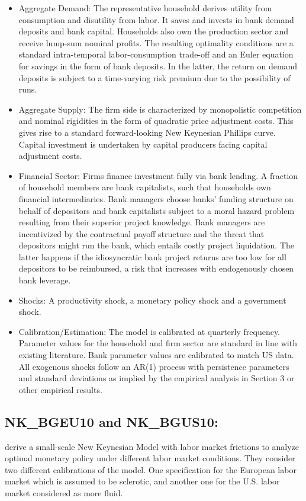 \documentclass[11pt,a4paper]{article}
\begin{document}
	\begin{itemize}
		\item Aggregate Demand: The representative household derives utility from consumption and disutility from labor. It saves and invests in bank demand deposits and bank capital. Households also own the production sector and receive lump-sum nominal profits. The resulting optimality conditions are a standard intra-temporal labor-consumption trade-off and an Euler equation for savings in the form of bank deposits. In the latter, the return on demand deposits is subject to a time-varying risk premium due to the possibility of runs. 
		\item Aggregate Supply: The firm side is characterized by monopolistic competition and nominal rigidities in the form of \cite{Rotemberg1982} quadratic price adjustment costs. This gives rise to a standard \cite{Rotemberg1982} forward-looking New Keynesian Phillips curve. Capital investment is undertaken by capital producers facing capital adjustment costs. 
		\item  Financial Sector: Firms finance investment fully via bank lending. A fraction of household members are bank capitalists, such that households own financial intermediaries. Bank managers choose banks' funding structure on behalf of depositors and bank capitalists subject to a moral hazard problem resulting from their superior project knowledge. Bank managers are incentivized by the contractual payoff structure and the threat that depositors might run the bank, which entails costly project liquidation. The latter happens if the idiosyncratic bank project returns are too low for all depositors to be reimbursed, a risk that increases with endogenously chosen bank leverage. 
		\item Shocks: A productivity shock, a monetary policy shock and a government shock. 
		\item Calibration/Estimation: The model is calibrated at quarterly frequency. Parameter values for the household and firm sector are standard in line with existing literature. Bank parameter values are calibrated to match US data. All exogenous shocks follow an AR(1) process with persistence parameters and standard deviations as implied by the empirical analysis in Section 3 or other empirical results.
	\end{itemize}
	
	
	\subsection{NK\_BGEU10 and NK\_BGUS10: \texorpdfstring{\cite{BlanchardGali10}}{Blanchard and GalÃƒÂ­ (2010)}}
	\label{NKBGEU10}
	\cite{BlanchardGali10} derive a small-scale New Keynesian Model with
	labor market frictions to analyze optimal monetary policy under different
	labor market conditions. They consider two different calibrations of the
	model. One specification for the European labor market which is assumed to be sclerotic, and another one for the U.S. labor market considered as more fluid.  
	
\end{document}
